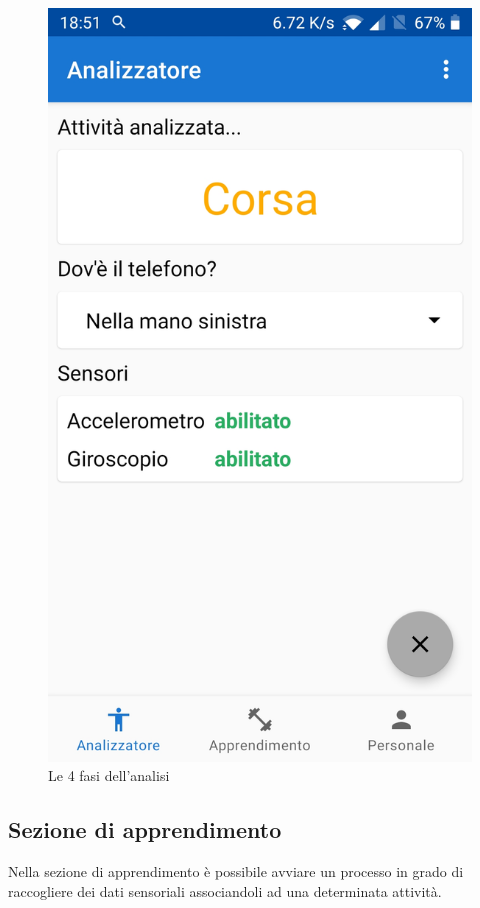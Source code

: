 \begin{figure}[H]
    \includegraphics[scale = 0.10]{assets/images/screenshots/1d_Prediction.jpg}
    \caption{Le 4 fasi dell'analisi}
    \label{fig:screenshots_analysis}
\end{figure}



\subsection{Sezione di apprendimento}
Nella sezione di apprendimento è possibile avviare un processo in grado di raccogliere dei dati sensoriali associandoli ad una
determinata attività. 

